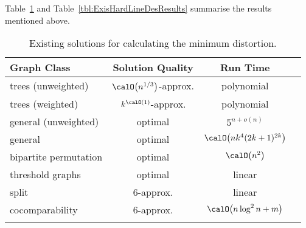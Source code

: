 Table~\ref{tbl:ExisPosLineDesResults} and Table~\ref{tbl:ExisHardLineDesResults} summarise the results mentioned above.

\begin{table}
    [htb]
    \centering
    \caption
    {%
        Existing solutions for calculating the minimum distortion.
    }
    \label{tbl:ExisPosLineDesResults}
%
    \def\arraystretch{1.25}
    \begin{tabular}{lccc}
        \hline
        Graph Class
            & Solution Quality
            & Run Time
            & \\
        \hline
        trees (unweighted)
            & $\calO \! \left( n^{1/3} \right)$-approx.
            & polynomial
            & \cite{BadDhaGupRab2005} \\
        trees (weighted)
            & $k^{\calO(1)}$-approx.
            & polynomial
            & \cite{BadChuIndSid2005} \\
        general (unweighted)
            & optimal
            & $5^{n+o(n)}$
            & \cite{FomiLoksSaur2011} \\
        general
            & optimal
            & $\calO \! \left( n k^4 (2k + 1)^{2k} \right)$
            & \cite{FelFomLokLos2013} \\
        bipartite permutation
            & optimal
            & $\calO \! \left( n^2 \right)$
            & \cite{HeggMeisPros2011} \\
        threshold graphs
            & optimal
            & linear
            & \cite{HeggMeisPros2011} \\
        split
            & 6-approx.
            & linear
            & \cite{HeggerMeiste2010} \\
        cocomparability
            & 6-approx.
            & $\calO \! \left( n \log^2 n + m \right)$
            & \cite{HeggerMeiste2010} \\
        \noalign{\smallskip}
        \hline
    \end{tabular}
\end{table}

